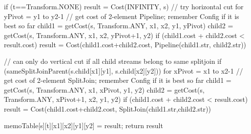   if (t==Transform.NONE)
    result = Cost(INFINITY, s)
    // try horizontal cut
    for yPivot = y1 to y2-1
      // get cost of 2-element Pipeline; remember Config if it is best so far
      child1 = getCost(s, Transform.ANY, x1, x2, y1, yPivot)
      child2 = getCost(s, Transform.ANY, x1, x2, yPivot+1, y2)
      if (child1.cost + child2.cost < result.cost)
        result = Cost(child1.cost+child2.cost, Pipeline(child1.str, child2.str))

    // can only do vertical cut if all child streams belong to same splitjoin
    if (sameSplitJoinParent(s.child[x1][y1], s.child[x2][y2]))
      for xPivot = x1 to x2-1
        // get cost of 2-element SplitJoin; remember Config if it is best so far
        child1 = getCost(s, Transform.ANY, x1, xPivot, y1, y2)
        child2 = getCost(s, Transform.ANY, xPivot+1, x2, y1, y2)
        if (child1.cost + child2.cost < result.cost)
          result = Cost(child1.cost+child2.cost, SplitJoin(child1.str,child2.str))

  memoTable[s][t][x1][x2][y1][y2] = result;
  return result
